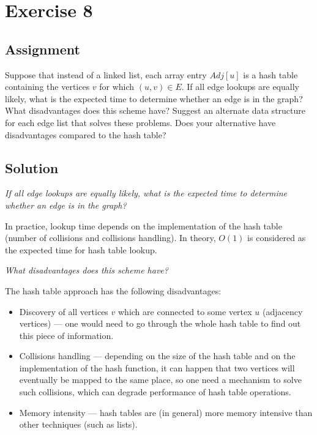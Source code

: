 
\section*{Exercise 8}
\label{sec:Ex8}

\subsection*{Assignment}

Suppose that instead of a linked list, each array entry $Adj[u]$ is a hash
table containing the vertices $v$ for which $(u, v) \in E$. If all edge lookups
are equally likely, what is the expected time to determine whether an edge is
in the graph? What disadvantages does this scheme have? Suggest an alternate
data structure for each edge list that solves these problems. Does your
alternative have disadvantages compared to the hash table?

\subsection*{Solution}

\textit{If all edge lookups are equally likely, what is the expected time to
determine whether an edge is in the graph?}

In practice, lookup time depends on the implementation of the hash table
(number of collisions and collisions handling). In theory, $O(1)$ is considered
as the expected time for hash table lookup.

\textit{What disadvantages does this scheme have?}

The hash table approach has the following disadvantages:

\begin{itemize}
	\item Discovery of all vertices $v$ which are connected to some vertex $u$
	(adjacency vertices) --- one would need to go through the whole hash table
	to find out this piece of information.

	\item Collisions handling --- depending on the size of the hash table and
	on the implementation of the hash function, it can happen that two vertices
	will eventually be mapped to the same place, so one need a mechanism to
	solve such collisions, which can degrade performance of hash table
	operations.

	\item Memory intensity --- hash tables are (in general) more memory
	intensive than other techniques (such as lists).
\end{itemize}

